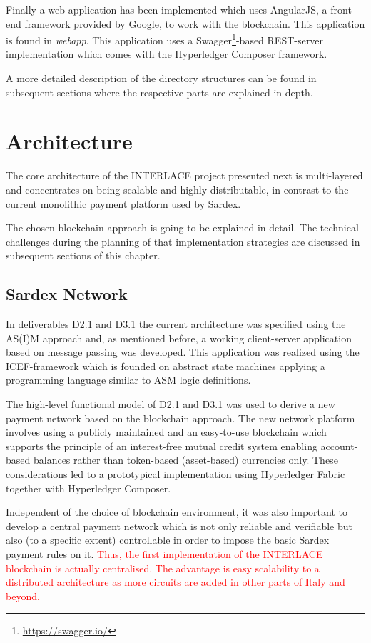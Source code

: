 Finally a web application has been implemented which uses AngularJS, a front-end framework provided by Google,  to work with the blockchain. This application is found in \textit{webapp}. This application uses a Swagger\footnote{\url{https://swagger.io/}}-based REST-server implementation which comes with the Hyperledger Composer framework.

A more detailed description of the directory structures can be found in subsequent sections where the respective parts are explained in depth.

\section{Architecture}

The core architecture of the INTERLACE project presented next is multi-layered and concentrates on being scalable and highly distributable, in contrast to the current monolithic payment platform used by Sardex.

The chosen blockchain approach is going to be explained in detail. The technical challenges during the planning of that implementation strategies are discussed in subsequent sections of this chapter.

\subsection{Sardex Network}

In deliverables D2.1 and D3.1 the current architecture was specified using the AS(I)M approach and, as mentioned before, a working client-server application based on message passing was developed. This application was realized using the ICEF-framework which is founded on abstract state machines applying a programming language similar to ASM logic definitions.

The high-level functional model of D2.1 and D3.1 was used to derive a new payment network based on the blockchain approach. The new network platform involves using a publicly maintained and an easy-to-use blockchain which supports the principle of an interest-free mutual credit system enabling account-based balances rather than token-based (asset-based) currencies only. These considerations led to a prototypical implementation using Hyperledger Fabric together with Hyperledger Composer.

Independent of the choice of blockchain environment, it was also important to develop a central payment network which is not only reliable and verifiable but also (to a specific extent) controllable in order to impose the basic Sardex payment rules on it. \textcolor{red}{Thus, the first implementation of the INTERLACE blockchain is actually centralised. The advantage is easy scalability to a distributed architecture as more circuits are added in other parts of Italy and beyond.}

